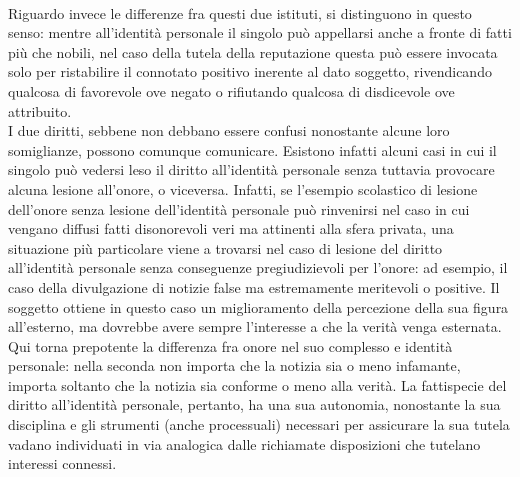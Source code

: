 \\Riguardo invece le differenze fra questi due istituti, si distinguono in questo senso: mentre all'identità personale il singolo può appellarsi anche a fronte di fatti più che nobili, nel caso della tutela della reputazione questa può essere invocata solo per ristabilire il connotato positivo inerente al dato soggetto, rivendicando qualcosa di favorevole ove negato o rifiutando qualcosa di disdicevole ove attribuito.
\\I due diritti, sebbene non debbano essere confusi nonostante alcune loro somiglianze, possono comunque comunicare.
Esistono infatti alcuni casi in cui il singolo può vedersi leso il diritto all'identità personale senza tuttavia provocare alcuna lesione all'onore, o viceversa.
Infatti, se l'esempio scolastico di lesione dell'onore senza lesione dell'identità personale può rinvenirsi nel caso in cui vengano diffusi fatti disonorevoli veri ma attinenti alla sfera privata, una situazione più particolare viene a trovarsi nel caso di lesione del diritto all'identità personale senza conseguenze pregiudizievoli per l'onore: ad esempio, il caso della divulgazione di notizie false ma estremamente meritevoli o positive. Il soggetto ottiene in questo caso un miglioramento della percezione della sua figura all'esterno, ma dovrebbe avere sempre l'interesse a che la verità venga esternata. Qui torna prepotente la differenza fra onore nel suo complesso e identità personale: nella seconda non importa che la notizia sia o meno infamante, importa soltanto che la notizia sia conforme o meno alla verità.
La fattispecie del diritto all’identità personale, pertanto, ha una sua autonomia, nonostante la sua disciplina e gli strumenti (anche processuali) necessari per assicurare la sua tutela vadano individuati in via analogica dalle richiamate disposizioni che tutelano interessi connessi.
